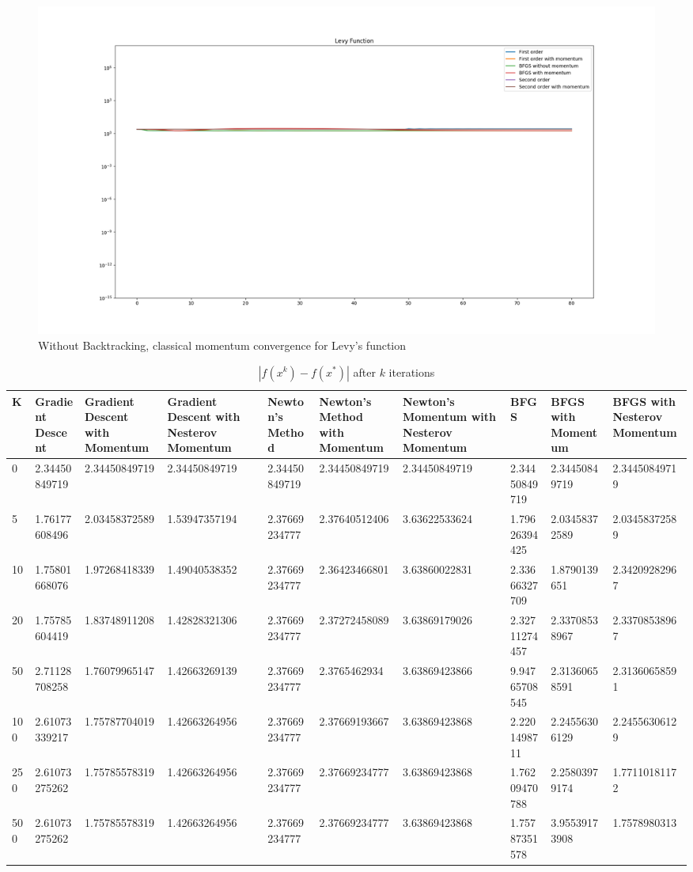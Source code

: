 \documentclass{article}
\begin{document}
\begin{figure}[H]
	\includegraphics[width=\linewidth]{../Images/levymomentum1.png}
	\caption{Without Backtracking, classical momentum convergence for Levy's function}
	\label{fig:Without Backtracking, classical momentum convergence for Levy's function}
\end{figure}	

\begin{table}[H]
	\centering
	\caption{$ | f(x^k) - f(x^*) | $ after $k$ iterations}
	\label{Levy's function table}
	\begin{tabular}{|l|l|l|l|l|l|l|l|l|l|}
		\hline
		K & Gradient Descent & Gradient Descent with Momentum & Gradient Descent with Nesterov Momentum & Newton's Method & Newton's Method with Momentum & Newton's Momentum with Nesterov Momentum & BFGS & BFGS with Momentum & BFGS with Nesterov Momentum \\
		\hline
		0 & 2.34450849719 & 2.34450849719 & 2.34450849719 & 2.34450849719 & 2.34450849719 & 2.34450849719 & 2.34450849719 & 2.34450849719 & 2.34450849719 \\
		\hline
		5 & 1.76177608496 & 2.03458372589 & 1.53947357194 & 2.37669234777 & 2.37640512406 & 3.63622533624 & 1.79626394425 & 2.03458372589 & 2.03458372589 \\
		\hline
		10 & 1.75801668076 & 1.97268418339 & 1.49040538352 & 2.37669234777 & 2.36423466801 & 3.63860022831 & 2.33666327709 & 1.8790139651 & 2.34209282967 \\
		\hline
		20 & 1.75785604419 & 1.83748911208 & 1.42828321306 & 2.37669234777 & 2.37272458089 & 3.63869179026 & 2.32711274457 & 2.33708538967 & 2.33708538967 \\
		\hline
		50 & 2.71128708258 & 1.76079965147 & 1.42663269139 & 2.37669234777 & 2.3765462934 & 3.63869423866 & 9.94765708545 & 2.31360658591 & 2.31360658591 \\
		\hline
		100 & 2.61073339217 & 1.75787704019 & 1.42663264956 & 2.37669234777 & 2.37669193667 & 3.63869423868 & 2.2201498711 & 2.24556306129 & 2.24556306129 \\
		\hline
		250 & 2.61073275262 & 1.75785578319 & 1.42663264956 & 2.37669234777 & 2.37669234777 & 3.63869423868 & 1.76209470788 & 2.25803979174 & 1.77110181172 \\
		\hline
		500 & 2.61073275262 & 1.75785578319 & 1.42663264956 & 2.37669234777 & 2.37669234777 & 3.63869423868 & 1.75787351578 & 3.95539173908 & 1.7578980313 \\
		\hline
	\end{tabular}
\end{table}
\end{document}
